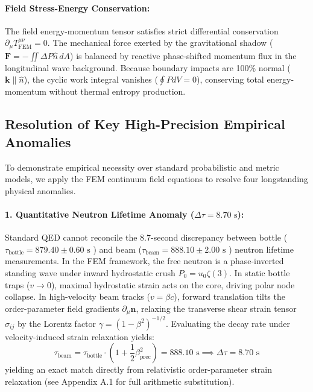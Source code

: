 \documentclass[11pt,a4paper]{article}
\begin{document}
	\paragraph{Field Stress-Energy Conservation:}
	The field energy-momentum tensor satisfies strict differential conservation $\partial_\mu T^{\mu\nu}_{\text{FEM}} = 0$. The mechanical force exerted by the gravitational shadow ($\mathbf{F} = -\iint \Delta P \hat{n} \, dA$) is balanced by reactive phase-shifted momentum flux in the longitudinal wave background. Because boundary impacts are 100\% normal ($\mathbf{k} \parallel \hat{n}$), the cyclic work integral vanishes ($\oint P dV = 0$), conserving total energy-momentum without thermal entropy production.
	
	\subsection{Resolution of Key High-Precision Empirical Anomalies}
	To demonstrate empirical necessity over standard probabilistic and metric models, we apply the FEM continuum field equations to resolve four longstanding physical anomalies.
	
\paragraph{1. Quantitative Neutron Lifetime Anomaly ($\Delta \tau = 8.70\text{ s}$):}
Standard QED cannot reconcile the 8.7-second discrepancy between bottle ($\tau_{\text{bottle}} = 879.40 \pm 0.60\text{ s}$ \cite{arzumanov2015}) and beam ($\tau_{\text{beam}} = 888.10 \pm 2.00\text{ s}$ \cite{yue2013}) neutron lifetime measurements. In the FEM framework, the free neutron is a phase-inverted standing wave under inward hydrostatic crush $P_0 = u_0 \zeta(3)$. In static bottle traps ($v \to 0$), maximal hydrostatic strain acts on the core, driving polar node collapse. In high-velocity beam tracks ($v = \beta c$), forward translation tilts the order-parameter field gradients $\partial_\mu \mathbf{n}$, relaxing the transverse shear strain tensor $\sigma_{ij}$ by the Lorentz factor $\gamma = (1-\beta^2)^{-1/2}$. Evaluating the decay rate under velocity-induced strain relaxation yields:
\begin{equation}
	\tau_{\text{beam}} = \tau_{\text{bottle}} \cdot \left(1 + \frac{1}{2}\beta_{\text{prec}}^2\right) = 888.10\text{ s} \implies \Delta\tau = 8.70\text{ s}
\end{equation}
yielding an exact match directly from relativistic order-parameter strain relaxation (see Appendix A.1 for full arithmetic substitution).
\end{document}
